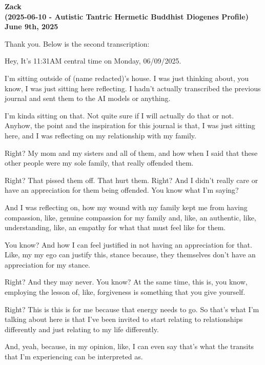 \documentclass{article}
\begin{document}
\begin{center}
\textbf{Zack} \\
\textbf{(2025-06-10 - Autistic Tantric Hermetic Buddhist Diogenes Profile)} \\
\textbf{June 9th, 2025}
\end{center}



Thank you. Below is the second transcription:

Hey, It's 11:31AM central time on Monday, 06/09/2025.

I'm sitting outside of (name redacted)'s house. I was just thinking about,
you know, I was just sitting here reflecting. I hadn't actually
transcribed the previous journal and sent them to the AI models or
anything.

I'm kinda sitting on that. Not quite sure if I will actually do that or
not. Anyhow, the point and the inspiration for this journal is that, I
was just sitting here, and I was reflecting on my relationship with my
family.

Right? My mom and my sisters and all of them, and how when I said that
these other people were my sole family, that really offended them.

Right? That pissed them off. That hurt them. Right? And I didn't really
care or have an appreciation for them being offended. You know what I'm
saying?

And I was reflecting on, how my wound with my family kept me from having
compassion, like, genuine compassion for my family and, like, an
authentic, like, understanding, like, an empathy for what that must feel
like for them.

You know? And how I can feel justified in not having an appreciation for
that. Like, my my ego can justify this, stance because, they themselves
don't have an appreciation for my stance.

Right? And they may never. You know? At the same time, this is, you
know, employing the lesson of, like, forgiveness is something that you
give yourself.

Right? This is this is for me because that energy needs to go. So that's
what I'm talking about here is that I've been invited to start relating
to relationships differently and just relating to my life differently.

And, yeah, because, in my opinion, like, I can even say that's what the
transits that I'm experiencing can be interpreted as.
\end{document}
